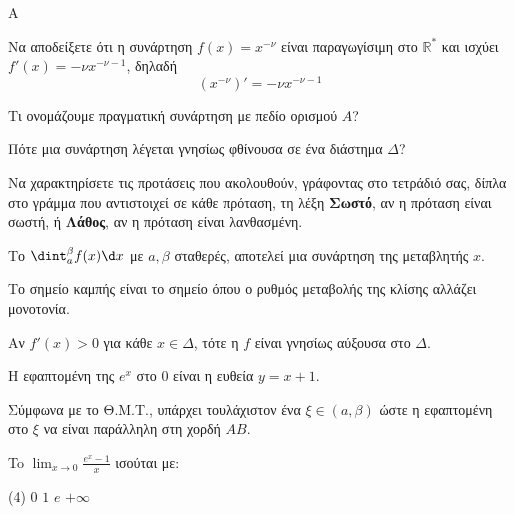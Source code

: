 \begin{thema}{A}
\begin{erwthma}
    \item Να αποδείξετε ότι η συνάρτηση $ f(x)=x^{-\nu} $ είναι παραγωγίσιμη στο $ \mathbb{R}^* $ και ισχύει $ f'(x)=-\nu x^{-\nu-1} $, δηλαδή \[ \left(x^{-\nu} \right)'=-\nu x^{-\nu-1} \]
    \item Τι ονομάζουμε πραγματική συνάρτηση με πεδίο ορισμού $A$?
    \item Πότε μια συνάρτηση λέγεται γνησίως φθίνουσα σε ένα διάστημα $\Delta$?
    \item Να χαρακτηρίσετε τις προτάσεις που ακολουθούν, γράφοντας στο τετράδιό σας, δίπλα στο γράμμα που αντιστοιχεί σε κάθε πρόταση, τη λέξη \textbf{Σωστό}, αν η πρόταση είναι σωστή, ή \textbf{Λάθος}, αν η πρόταση είναι λανθασμένη.
    \begin{alist}
        \item Το $\dint_{a}^{\beta} f(x) \d x$ με $a, \beta$ σταθερές, αποτελεί μια συνάρτηση της μεταβλητής $x$.
        \item Το σημείο καμπής είναι το σημείο όπου ο ρυθμός μεταβολής της κλίσης αλλάζει μονοτονία.
        \item Αν $f'(x) > 0$ για κάθε $x \in \Delta$, τότε η $f$ είναι γνησίως αύξουσα στο $\Delta$.
        \item Η εφαπτομένη της $e^x$ στο $0$ είναι η ευθεία $y=x+1$.
        \item Σύμφωνα με το Θ.Μ.Τ., υπάρχει τουλάχιστον ένα $\xi \in (a, \beta)$ ώστε η εφαπτομένη στο $\xi$ να είναι παράλληλη στη χορδή $AB$.
    \end{alist}
    \item To $\displaystyle\lim_{x\to 0} \frac{e^x - 1}{x}$ ισούται με:
    \begin{tasks}[label=\let\textdexiakeraia\relax\alph*.](4)
        \task $0$
        \task $1$
        \task $e$
        \task $+\infty$
    \end{tasks}
\end{erwthma}
\end{thema}


